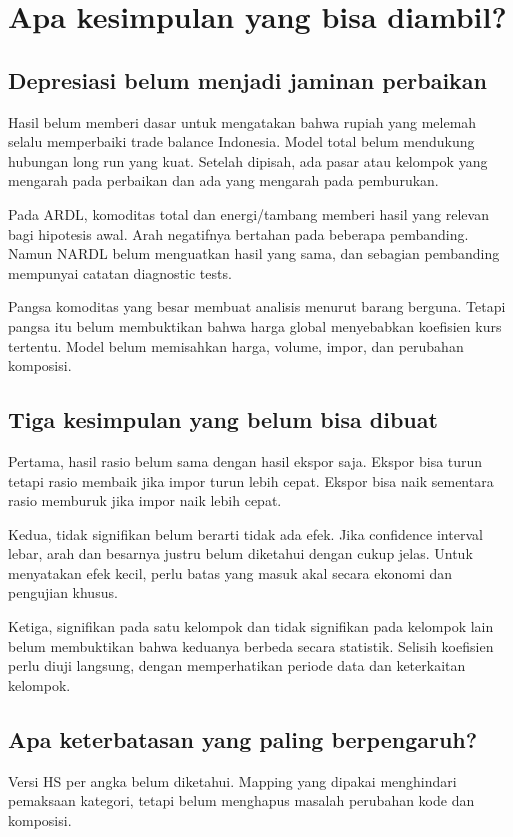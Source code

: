 \section{Apa kesimpulan yang bisa diambil?}\label{sec:discussion}
\subsection{Depresiasi belum menjadi jaminan perbaikan}
Hasil belum memberi dasar untuk mengatakan bahwa rupiah yang melemah selalu memperbaiki trade balance Indonesia. Model total belum mendukung hubungan long run yang kuat. Setelah dipisah, ada pasar atau kelompok yang mengarah pada perbaikan dan ada yang mengarah pada pemburukan.

Pada ARDL, komoditas total dan energi/tambang memberi hasil yang relevan bagi hipotesis awal. Arah negatifnya bertahan pada beberapa pembanding. Namun NARDL belum menguatkan hasil yang sama, dan sebagian pembanding mempunyai catatan diagnostic tests.

Pangsa komoditas yang besar membuat analisis menurut barang berguna. Tetapi pangsa itu belum membuktikan bahwa harga global menyebabkan koefisien kurs tertentu. Model belum memisahkan harga, volume, impor, dan perubahan komposisi.

\subsection{Tiga kesimpulan yang belum bisa dibuat}
Pertama, hasil rasio belum sama dengan hasil ekspor saja. Ekspor bisa turun tetapi rasio membaik jika impor turun lebih cepat. Ekspor bisa naik sementara rasio memburuk jika impor naik lebih cepat.

Kedua, tidak signifikan belum berarti tidak ada efek. Jika confidence interval lebar, arah dan besarnya justru belum diketahui dengan cukup jelas. Untuk menyatakan efek kecil, perlu batas yang masuk akal secara ekonomi dan pengujian khusus.

Ketiga, signifikan pada satu kelompok dan tidak signifikan pada kelompok lain belum membuktikan bahwa keduanya berbeda secara statistik. Selisih koefisien perlu diuji langsung, dengan memperhatikan periode data dan keterkaitan kelompok.

\subsection{Apa keterbatasan yang paling berpengaruh?}
Versi HS per angka belum diketahui. Mapping yang dipakai menghindari pemaksaan kategori, tetapi belum menghapus masalah perubahan kode dan komposisi.

